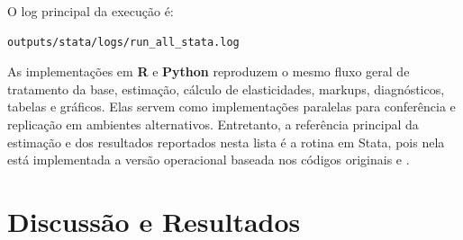 \documentclass[12pt,a4paper]{article}
\begin{document}
O log principal da execução é:

\begin{verbatim}
outputs/stata/logs/run_all_stata.log
\end{verbatim}

As implementações em \textbf{R} e \textbf{Python} reproduzem o mesmo fluxo geral de tratamento da base, estimação, cálculo de elasticidades, markups, diagnósticos, tabelas e gráficos. Elas servem como implementações paralelas para conferência e replicação em ambientes alternativos. Entretanto, a referência principal da estimação e dos resultados reportados nesta lista é a rotina em Stata, pois nela está implementada a versão operacional baseada nos códigos originais  e .

\section{Discussão e Resultados}
\end{document}
